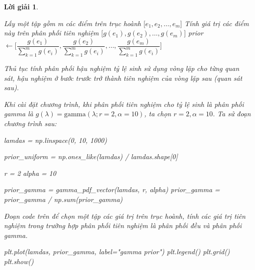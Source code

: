 \documentclass[14pt, a4paper]{article}
\theoremstyle{sltheorem}
\theoremstyle{soltheorem}
\newtheorem*{loigiai}{Lời giải}
\begin{document}
\begin{loigiai}
\begin{enumerate}
        \begin{algorithm}[h!]
            \DontPrintSemicolon
            Lấy một tập gồm m các điểm trên trục hoành $\lbrack e_1, e_2, \dots, e_m \rbrack$\;
            Tính giá trị các điểm này trên phân phối tiên nghiệm $\lbrack g(e_1), g(e_2), \dots, g(e_m) \rbrack$\;
            prior $\gets \Big \lbrack \dfrac{g(e_1)}{\sum_{k=1}^m g(e_i)}, \dfrac{g(e_2)}{\sum_{k=1}^m g(e_i)}, \dots, \dfrac{g(e_m)}{\sum_{k=1}^m g(e_i)} \Big \rbrack$\;
            \;
            \caption{Thủ tục tính phân phối hậu nghiệm tỷ lệ sinh sử dụng vòng lặp cho từng quan sát, hậu nghiệm ở bước trước trở thành tiên nghiệm của vòng lặp sau (quan sát sau).}
        \end{algorithm}

        Khi cài đặt chương trình, khi phân phối tiên nghiệm cho tỷ lệ sinh là phân phối gamma là $g(\lambda) = \text{gamma}(\lambda; r=2, \alpha=10)$, ta chọn $r=2, \alpha=10$.
        Ta sử đoạn chương trình sau:

        \begin{python}
lamdas = np.linspace(0, 10, 1000)

prior_uniform = np.ones_like(lamdas) / lamdas.shape[0]
            
r = 2
alpha = 10
            
prior_gamma = gamma_pdf_vector(lamdas, r, alpha)
prior_gamma = prior_gamma / np.sum(prior_gamma)
        \end{python}

        Đoạn code trên để chọn một tập các giá trị trên trục hoành, tính các giá trị tiên nghiệm trong trường hợp phân phối tiên nghiệm là phân phối đều và phân phối gamma.

        \begin{python}
plt.plot(lamdas, prior_gamma, label="gamma prior")
plt.legend()
plt.grid()
plt.show()
        \end{python}


\end{enumerate}
\end{loigiai}
\end{document}
